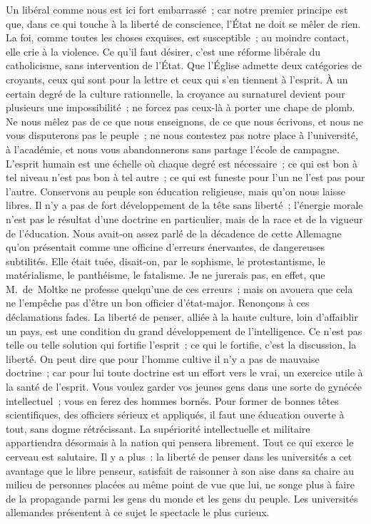\documentclass[french,twoside]{book} %
\begin{document}
Un libéral comme nous est ici fort embarrassé ; car notre premier principe est que, dans ce qui touche à la liberté de conscience, l’État ne doit se mêler de rien. La foi, comme toutes les choses exquises, est susceptible ; au moindre contact, elle crie à la violence. Ce qu’il faut désirer, c’est une réforme libérale du catholicisme, sans intervention de l’État. Que l’Église admette deux catégories de croyants, ceux qui sont pour la lettre et ceux qui s’en tiennent à l’esprit. À un certain degré de la culture rationnelle, la croyance au surnaturel devient pour plusieurs une impossibilité ; ne forcez pas ceux-là à porter une chape de plomb. Ne nous mêlez pas de ce que nous enseignons, de ce que nous écrivons, et nous ne vous disputerons pas le peuple ; ne nous contestez pas notre place à l’université, à l’académie, et nous vous abandonnerons sans partage l’école de campagne. L’esprit humain est une échelle où chaque degré est nécessaire ; ce qui est bon à tel niveau n’est pas bon à tel autre ; ce qui est funeste pour l’un ne l’est pas pour l’autre. Conservons au peuple son éducation religieuse, mais qu’on nous laisse libres. Il n’y a pas de fort développement de la tête sans liberté ; l’énergie morale n’est pas le résultat d’une doctrine en particulier, mais de la race et de la vigueur de l’éducation. Nous avait-on assez parlé de la décadence de cette Allemagne qu’on présentait comme une officine d’erreurs énervantes, de dangereuses subtilités. Elle était tuée, disait-on, par le sophisme, le protestantisme, le matérialisme, le panthéisme, le fatalisme. Je ne jurerais pas, en effet, que M. de Moltke ne professe quelqu’une de ces erreurs ; mais on avouera que cela ne l’empêche pas d’être un bon officier d’état-major. Renonçons à ces déclamations fades. La liberté de penser, alliée à la haute culture, loin d’affaiblir un pays, est une condition du grand développement de l’intelligence. Ce n’est pas telle ou telle solution qui fortifie l’esprit ; ce qui le fortifie, c’est la discussion, la liberté. On peut dire que pour l’homme cultive il n’y a pas de mauvaise doctrine ; car pour lui toute doctrine est un effort vers le vrai, un exercice utile à la santé de l’esprit. Vous voulez garder vos jeunes gens dans une sorte de gynécée intellectuel ; vous en ferez des hommes bornés. Pour former de bonnes têtes scientifiques, des officiers sérieux et appliqués, il faut une éducation ouverte à tout, sans dogme rétrécissant. La supériorité intellectuelle et militaire appartiendra désormais à la nation qui pensera librement. Tout ce qui exerce le cerveau est salutaire. Il y a plus : la liberté de penser dans les universités a cet avantage que le libre penseur, satisfait de raisonner à son aise dans sa chaire au milieu de personnes placées au même point de vue que lui, ne songe plus à faire de la propagande parmi les gens du monde et les gens du peuple. Les universités allemandes présentent à ce sujet le spectacle le plus curieux.\par
\end{document}
